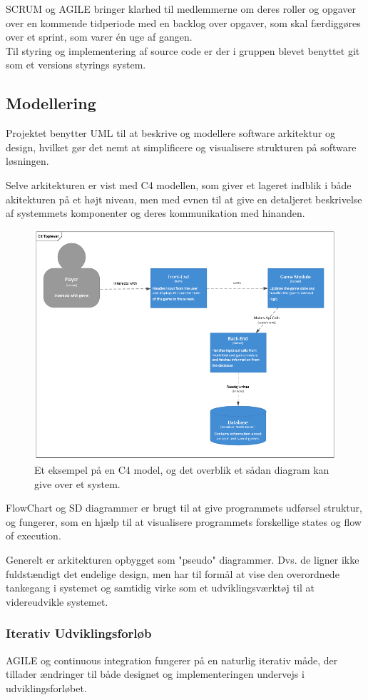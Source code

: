 SCRUM og AGILE bringer klarhed til medlemmerne om deres roller og opgaver over en 
kommende tidperiode med en backlog over opgaver, som skal færdiggøres over et sprint, som varer én uge af gangen.\\
Til styring og implementering af source code er der i gruppen blevet benyttet git som et versions styrings system.

\subsection{Modellering}
Projektet benytter UML til at beskrive og modellere software arkitektur
og design, hvilket gør det nemt at simplificere og visualisere strukturen på software
løsningen. 

Selve arkitekturen er vist med C4 modellen, som giver et lageret indblik i både
akitekturen på et højt niveau, men med evnen til at give en detaljeret beskrivelse
af systemmets komponenter og deres kommunikation med hinanden.

\begin{figure}[H]
  \centering
  \includegraphics[scale=0.8]{02-Body/Images/C4TopLvlDB.PNG}
  \caption{Et eksempel på en C4 model, og det overblik et sådan diagram kan give over et system.}
  \label{fig:c4}
\end{figure}

FlowChart og SD diagrammer er brugt til at give programmets udførsel struktur, og fungerer,
som en hjælp til at visualisere programmets forskellige states og flow of execution.

Generelt er arkitekturen opbygget som "pseudo" diagrammer. Dvs. de ligner ikke fuldstændigt det endelige design, men har til formål at vise den overordnede tankegang i systemet og samtidig 
virke som et udviklingsværktøj til at videreudvikle systemet.

\subsubsection{Iterativ Udviklingsforløb}

AGILE og continuous integration fungerer på en naturlig iterativ måde, der tillader 
ændringer til både designet og implementeringen undervejs i udviklingsforløbet.\\



